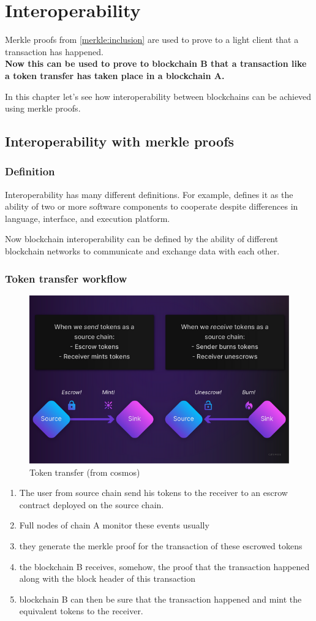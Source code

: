 \chapter{Interoperability}
Merkle proofs from \ref{merkle:inclusion} are used to prove to a light client that a transaction has happened. \\
\textbf{Now this can be used to prove to blockchain B that a transaction like a token transfer has taken place in a blockchain A.}

In this chapter let's see how interoperability between blockchains can be achieved using merkle proofs. 

\section{Interoperability with merkle proofs}
\subsection{Definition}
Interoperability has many different definitions. 
For example, \cite{wegner1996interoperability} defines it as the ability of two or
more software components to cooperate
despite differences in language, 
interface, and execution platform.

Now blockchain interoperability can be defined by the ability of different blockchain networks to communicate and exchange data with each other.


\subsection{Token transfer workflow}
\begin{figure}[H]
    \centering
    \includegraphics[width=0.5\linewidth]{interoperability/transfer_token.png}
    \caption{Token transfer (from cosmos)}
    \label{fig:token_transfer}
\end{figure}
\begin{enumerate}
    \item The user from source chain send his tokens to the receiver to an escrow contract deployed on the source chain. 
    \item Full nodes of chain A monitor these events usually
    \item they generate the merkle proof for the transaction of these escrowed tokens
    \item the blockchain B receives, somehow, the proof that the transaction happened along with the block header of this transaction
    \item blockchain B can then be sure that the transaction happened and mint the equivalent tokens to the receiver.
\end{enumerate}



